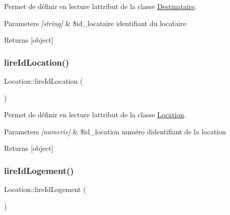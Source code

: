 Permet de définir en lecture l\textquotesingle{}attribut de la classe \hyperlink{class_destinataire}{Destinataire}. 


\begin{DoxyParams}{Parameters}
{\em \mbox{[}string\mbox{]}} & \$id\+\_\+locataire identifiant du locataire \\
\hline
\end{DoxyParams}
\begin{DoxyReturn}{Returns}
\mbox{[}object\mbox{]} 
\end{DoxyReturn}
\mbox{\label{class_location_acd888ff7d6a8a9ecea9095d3043c0269}} 
\subsubsection{\texorpdfstring{lire\+Id\+Location()}{lireIdLocation()}}
{\footnotesize\ttfamily Location\+::lire\+Id\+Location (\begin{DoxyParamCaption}{ }\end{DoxyParamCaption})}



Permet de définir en lecture l\textquotesingle{}attribut de la classe \hyperlink{class_location}{Location}. 


\begin{DoxyParams}{Parameters}
{\em \mbox{[}numeric\mbox{]}} & \$id\+\_\+location numéro d\textquotesingle{}identifiant de la location \\
\hline
\end{DoxyParams}
\begin{DoxyReturn}{Returns}
\mbox{[}object\mbox{]} 
\end{DoxyReturn}
\mbox{\label{class_location_aefef9a6a5d9d8873da317f860245a761}} 
\subsubsection{\texorpdfstring{lire\+Id\+Logement()}{lireIdLogement()}}
{\footnotesize\ttfamily Location\+::lire\+Id\+Logement (\begin{DoxyParamCaption}{ }\end{DoxyParamCaption})}



